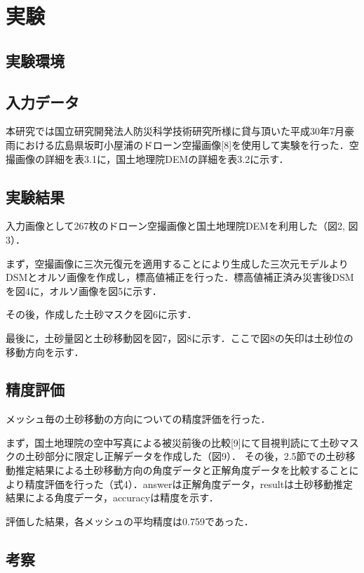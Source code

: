 \chapter{実験}
  \section{実験環境}

  \section{入力データ}
    本研究では国立研究開発法人防災科学技術研究所様に貸与頂いた平成30年7月豪雨における広島県坂町小屋浦のドローン空撮画像[8]を使用して実験を行った．空撮画像の詳細を表3.1に，国土地理院DEMの詳細を表3.2に示す．

  \section{実験結果}
    入力画像として267枚のドローン空撮画像と国土地理院DEMを利用した（図2, 図3）．
  
    まず，空撮画像に三次元復元を適用することにより生成した三次元モデルよりDSMとオルソ画像を作成し，標高値補正を行った．標高値補正済み災害後DSMを図4に，オルソ画像を図5に示す．
  
    その後，作成した土砂マスクを図6に示す．
  
    最後に，土砂量図と土砂移動図を図7，図8に示す．ここで図8の矢印は土砂位の移動方向を示す．
  
  
  \section{精度評価}
    メッシュ毎の土砂移動の方向についての精度評価を行った．

    まず，国土地理院の空中写真による被災前後の比較[9]にて目視判読にて土砂マスクの土砂部分に限定し正解データを作成した（図9）． その後，2.5節での土砂移動推定結果による土砂移動方向の角度データと正解角度データを比較することにより精度評価を行った（式4）．answerは正解角度データ，resultは土砂移動推定結果による角度データ，accuracyは精度を示す．


    評価した結果，各メッシュの平均精度は0.759であった．

  \section{考察}
